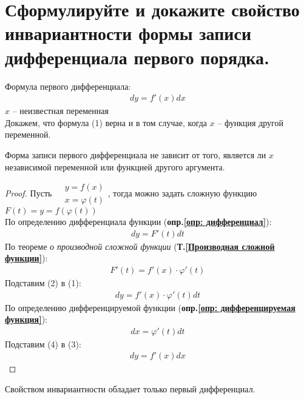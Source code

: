 \newpage
\section{Сформулируйте и докажите свойство инвариантности формы записи дифференциала первого порядка.}

Формула первого дифференциала: \vspace{-\topsep}
\begin{gather*}
  \boxed{dy = f'(x)dx} \tag{1}
\end{gather*} 
$x$ -- неизвестная переменная\\
Докажем, что формула (1) верна и в том случае, когда $x$ -- функция другой переменной.\\ \setcounter{equation}{0}
\begin{theorem}
  Форма записи первого дифференциала не зависит от того, является ли $x$ независимой переменной или функцией другого аргумента.
\end{theorem}
\begin{proof}
  Пусть $\begin{aligned}
    &y=f(x)\\
    &x=\varphi (t)
  \end{aligned}$, тогда можно задать сложную функцию $F(t) = y = f(\varphi (t))$\\
  По определению дифференциала функции (\textbf{опр.\ref{опр: дифференциал}}):
  \begin{gather}
    dy = F'(t)dt
  \end{gather} 
  По теореме \textit{о производной сложной функции} (\textbf{Т.\ref{Производная сложной функции}}):
  \begin{gather}
    F'(t) = f'(x) \cdot \varphi'(t)
  \end{gather} 
  Подставим (2) в (1): \vspace{-\topsep}
  \begin{gather}
    dy = f'(x) \cdot \varphi'(t)dt
  \end{gather}
  По определению дифференцируемой функции (\textbf{опр.\ref{опр: дифференцируемая функция}}):
  \begin{gather}
    dx = \varphi'(t)dt
  \end{gather}
  Подставим (4) в (3): \vspace{-1.5\topsep}
  \begin{gather*}
    \boxed{dy = f'(x)dx}
  \end{gather*} 
\end{proof}
\setcounter{equation}{0}
\begin{corollary}
  Свойством инвариантности обладает только первый дифференциал. 
\end{corollary} 

